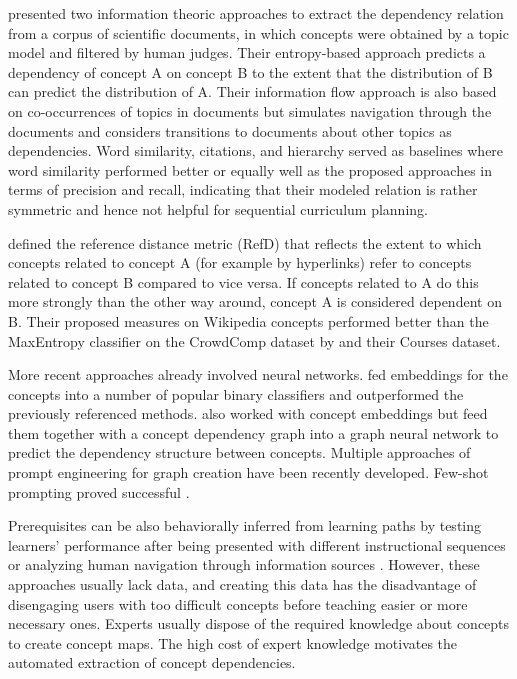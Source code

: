 \documentclass{article}
\begin{document}
\cite{gordon-etal-2016-modeling} presented two information theoric approaches to extract the dependency relation from a corpus of scientific documents, in which concepts were obtained by a topic model and filtered by human judges. Their entropy-based approach predicts a dependency of concept A on concept B to the extent that the distribution of B can predict the distribution of A. Their information flow approach is also based on co-occurrences of topics in documents but simulates navigation through the documents and considers transitions to documents about other topics as dependencies. Word similarity, citations, and hierarchy served as baselines where word similarity performed better or equally well as the proposed approaches in terms of precision and recall, indicating that their modeled relation is rather symmetric and hence not helpful for sequential curriculum planning.

\cite{liang2015measuring} defined the reference distance metric (RefD) that reflects the extent to which concepts related to concept A (for example by hyperlinks) refer to concepts related to concept B compared to vice versa. If concepts related to A do this more strongly than the other way around, concept A is considered dependent on B. Their proposed measures on Wikipedia concepts performed better than the MaxEntropy classifier on the CrowdComp dataset by \cite{talukdar2012crowdsourced} and their Courses dataset.

More recent approaches already involved neural networks. \cite{gasparetti2022discovering} fed embeddings for the concepts into a number of popular binary classifiers and outperformed the previously referenced methods.  \cite{sun2022conlearn} also worked with concept embeddings but feed them together with a concept dependency graph into a graph neural network to predict the dependency structure between concepts.
Multiple approaches of prompt engineering for graph creation have been recently developed. Few-shot prompting proved successful \citep{cohen2023crawling}.

Prerequisites can be also behaviorally inferred from learning paths by testing learners' performance after being presented with different instructional sequences \citep{pavlik2008using,vuong2011method} or analyzing human navigation through information sources \citep{gordon-etal-2016-modeling}. However, these approaches usually lack data, and creating this data has the disadvantage of disengaging users with too difficult concepts before teaching easier or more necessary ones. Experts usually dispose of the required knowledge about concepts to create concept maps. The high cost of expert knowledge motivates the automated extraction of concept dependencies.
\end{document}
